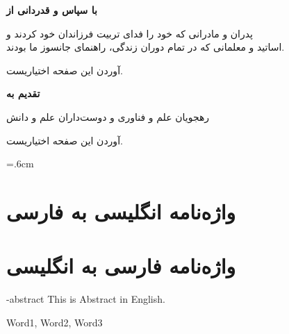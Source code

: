 \documentclass[oneside,openany,msc]{SBU-Thesis}
\begin{document}
	
\firstPage %
\davaranPage %

{
	\newpage
	\thispagestyle{plain}
	\noindent
	\large{\textbf{با سپاس و قدردانی از}}
	
	\noindent
	پدران و مادرانی که خود را فدای تربیت فرزاندان خود کردند و\\
	اساتید و معلمانی که در تمام دوران زندگی، راهنمای جانسوز ما بودند.
	
	
	\vspace{14cm}	
	آوردن این صفحه اختیاریست.
	
	\pagebreak
}

\rightsPage %
\copyRightPage %

{
	\newpage
	\thispagestyle{plain}
	\large{\textbf{تقدیم به}}
	
	\begin{center}
		رهجويان علم و فناوری و دوست‌داران علم و دانش
	\end{center}
	
	\vspace{14cm}	
	آوردن این صفحه اختیاریست.
	
	\pagebreak
}


\abstractPage %


\tableofcontents %
\listoffigures \newpage %
\listoftables \newpage %

		




	

\newpage



\baselineskip=.6cm

\chapter*{واژه‌نامه  انگلیسی به  فارسی}
\noindent
{}


\chapter*{واژه‌نامه فارسی به انگلیسی}
\noindent
{}

\baselineskip=1cm


\en-abstract
{
	This is Abstract in English.
}

\latinkeywords
{
	Word1, Word2, Word3
}

\latinAbstractPage %
\latinFirstPage %

	
\end{document}
